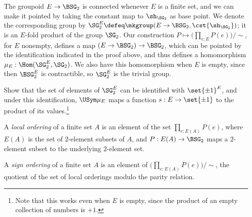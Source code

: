 \begin{remark}
  The groupoid $E \to \BSG_2$ is connected whenever $E$ is a finite set,
  and we can make it pointed by taking the constant map to $\sh_{\SG_2}$ as base point.
  We denote the corresponding group by
  $\SG_2^E \defeq \mkgroup(E \to \BSG_2,\cst{\sh_{\SG_2}})$;
  it is an $E$-fold product of the group $\SG_2$.
  Our construction $P \mapsto \bigl(\prod_{e:E}P(e)\bigr)/\sim$,
  for $E$ nonempty,
  defines a map $(E \to \BSG_2) \to \BSG_2$,
  which can be pointed by the identification indicated in the proof above,
  and thus defines a homomorphism $\mu_E : \Hom(\SG_2^E,\SG_2)$.
  We also have this homomorphism when $E$ is empty,
  since then $\BSG_2^E$ is contractible, so $\SG_2^E$ is the trivial group.
\end{remark}

\begin{xca}
  Show that the set of elements of $\SG_2^E$ can be identified with $\set{\pm1}^E$,
  and under this identification, $\USym\mu_E$ maps a function $s : E \to \set{\pm1}$
  to the product of its values.\footnote{%
    Note that this works even when $E$ is empty,
    since the product of an empty collection of numbers is $+1$.}
\end{xca}

\begin{definition}\label{def:sign-ordering}
  A \emph{local ordering} of a finite set $A$
  is an element of the set $\prod_{e:E(A)}P(e)$,
  where $E(A)$ is the set of $2$-element subsets of $A$,
  and $P : E(A) \to \BSG_2$ maps a $2$-element subset to the underlying $2$-element set.

  A \emph{sign ordering}
  of a finite set $A$ is an element of
  $\bigl(\prod_{e:E(A)}P(e)\bigr)/\sim$,
  \ie the quotient of the set of local orderings
  modulo the parity relation.
\end{definition}


